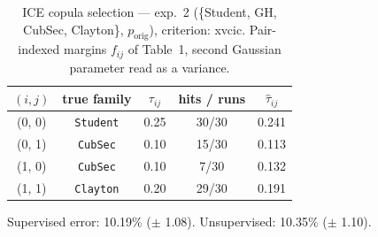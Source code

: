 \begin{table}[htbp]
  \centering
  \caption{ICE copula selection — exp.\ 2 (\{Student, GH, CubSec, Clayton\}, $p_{\text{orig}}$), criterion: xvcic. Pair-indexed margins $f_{ij}$ of Table~1, second Gaussian parameter read as a variance.}
  \label{tab:exp3-exp2_orig_p__xvcic}
  \begin{tabular}{ccccc}
    \toprule
    $(i, j)$ & true family & $\tau_{ij}$ & hits / runs & $\hat\tau_{ij}$ \\
    \midrule
    (0, 0) & \texttt{Student} & 0.25 & 30/30 & 0.241 \\
    (0, 1) & \texttt{CubSec} & 0.10 & 15/30 & 0.113 \\
    (1, 0) & \texttt{CubSec} & 0.10 & 7/30 & 0.132 \\
    (1, 1) & \texttt{Clayton} & 0.20 & 29/30 & 0.191 \\
    \bottomrule
  \end{tabular}
  \par\smallskip Supervised error: 10.19\% ($\pm$ 1.08). Unsupervised: 10.35\% ($\pm$ 1.10).
\end{table}
